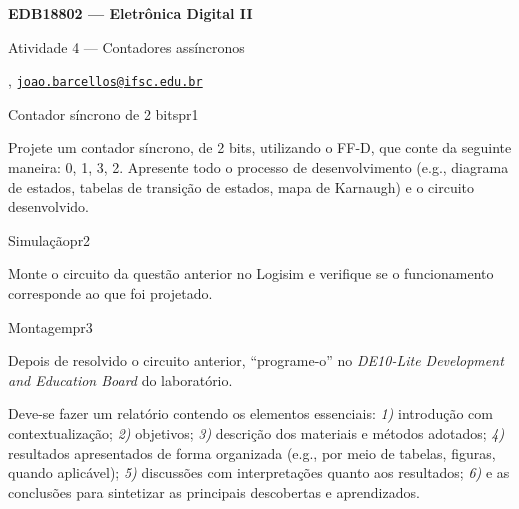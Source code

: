 



\usepackage[style=numeric, citestyle=ieee]{biblatex}




\begin{Large}
    \textbf{EDB18802 --- Eletrônica Digital II}
    
    Atividade 4 --- Contadores assíncronos \hfill {}
\end{Large}

\vspace{1ex}
\textbf{} , \href{mailto:joao.barcellos@ifsc.edu.br}{\texttt{joao.barcellos@ifsc.edu.br}}\\
\textbf{}

\vspace{2ex}

\begin{problem}{Contador síncrono de 2 bits}{pr1}

Projete um contador síncrono, de 2 bits, utilizando o FF-D, que conte da seguinte maneira: 0, 1, 3, 2. Apresente todo o processo de desenvolvimento (e.g., diagrama de estados, tabelas de transição de estados, mapa de Karnaugh) e o circuito desenvolvido.

\end{problem}

\begin{problem}{Simulação}{pr2}

Monte o circuito da questão anterior no Logisim e verifique se o funcionamento corresponde ao que foi projetado. \\

\end{problem}

\begin{problem}{Montagem}{pr3}
    
Depois de resolvido o circuito anterior, ``programe-o'' no \textit{DE10-Lite Development and Education Board} do laboratório. 

\end{problem}

\begin{obs}

Deve-se fazer um relatório contendo os elementos essenciais: \textit{1)} introdução com contextualização; \textit{2)} objetivos; \textit{3)} descrição dos materiais e métodos adotados; \textit{4)} resultados apresentados de forma organizada (e.g., por meio de tabelas, figuras, quando aplicável); \textit{5)} discussões com interpretações quanto aos resultados; \textit{6)} e as conclusões para sintetizar as principais descobertas e aprendizados.

\end{obs}

\newpage

\printbibliography


